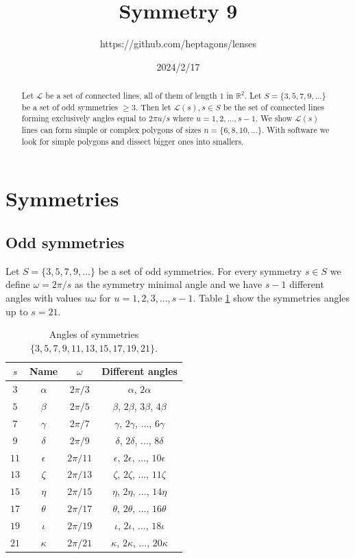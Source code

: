 \documentclass[11pt]{article}
\title{Symmetry 9}
\author{https://github.com/heptagons/lenses}
\date{2024/2/17}
\begin{document}
\maketitle
\begin{abstract}
Let $\mathcal{L}$ be a set of connected lines, all of them of length $1$ in $\mathbb{R}^2$.
Let $S=\{ 3,5,7,9,... \}$ be a set of odd symmetries $\geq 3$. Then let $\mathcal{L}(s), s \in S$ be the set of connected lines forming exclusively angles equal to $2\pi u/s$ where $u = 1,2,...,s-1$. We show $\mathcal{L}(s)$ lines can form simple or complex polygons of sizes $n=\{ 6,8,10,... \}$. With software we look for simple polygons and dissect bigger ones into smallers.
\end{abstract}

\section{Symmetries}

\subsection{Odd symmetries}

Let $S=\{ 3,5,7,9,... \}$ be a set of odd symmetries. For every symmetry $s \in S$ we define $\omega = 2\pi/s$ as the symmetry minimal angle and we have $s-1$ different angles with values $u\omega$ for $u=1,2,3,...,s-1$.
Table \ref{tbl:symm} show the symmetries angles up to $s=21$. 

\begin{table}[H]
\begin{center}
\begin{tabular}{|c|c c| c |}
\hline
$s$ & Name & $\omega$ & Different angles \\ \hline
$3$ & $\alpha$ & $2\pi/3$ & $\alpha$, $2\alpha$ \\ \hline
$5$ & $\beta$  & $2\pi/5$ & $\beta$, $2\beta$, $3\beta$, $4\beta$ \\ \hline
$7$ & $\gamma$ & $2\pi/7$ & $\gamma$, $2\gamma$, ..., $6\gamma$ \\ \hline
$9$ & $\delta$ & $2\pi/9$ & $\delta$, $2\delta$, ..., $8\delta$ \\ \hline
$11$ & $\epsilon$ & $2\pi/11$ & $\epsilon$, $2\epsilon$, ..., $10\epsilon$ \\ \hline
$13$ & $\zeta$ & $2\pi/13$ & $\zeta$, $2\zeta$, ..., $11\zeta$ \\ \hline
$15$ & $\eta$ & $2\pi/15$ & $\eta$, $2\eta$, ..., $14\eta$  \\ \hline
$17$ & $\theta$ & $2\pi/17$ & $\theta$, $2\theta$, ..., $16\theta$  \\ \hline
$19$ & $\iota$ & $2\pi/19$ & $\iota$, $2\iota$, ..., $18\iota$  \\ \hline
$21$ & $\kappa$ & $2\pi/21$ & $\kappa$, $2\kappa$, ..., $20\kappa$\\ \hline
\end{tabular}
\caption{Angles of symmetries $\{3,5,7,9,11,13,15,17,19,21\}$.} 
\label{tbl:symm}
\end{center}
\end{table}
\end{document}
